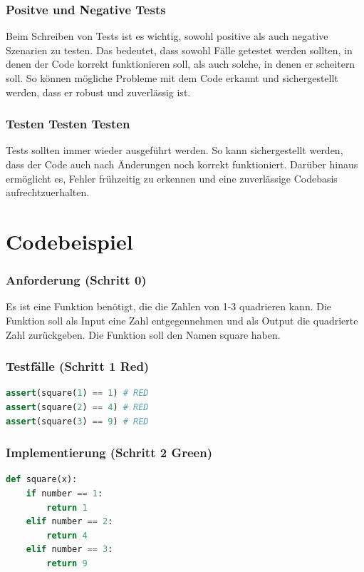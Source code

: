 \documentclass[a0,landscape]{a0poster}
\newcommand{\gqq}[1]{\glqq #1\grqq}
\begin{document}
\begin{multicols}{4}
\subsubsection*{Positve und Negative Tests}
Beim Schreiben von Tests ist es wichtig, sowohl positive als auch negative Szenarien zu testen. Das bedeutet, dass sowohl Fälle getestet werden sollten, in denen der Code korrekt funktionieren soll, als auch solche, in denen er scheitern soll. So können mögliche Probleme mit dem Code erkannt und sichergestellt werden, dass er robust und zuverlässig ist.

\subsubsection*{Testen Testen Testen}
Tests sollten immer wieder ausgeführt werden. So kann sichergestellt werden, dass der Code auch nach Änderungen noch korrekt funktioniert. Darüber hinaus ermöglicht es, Fehler frühzeitig zu erkennen und eine zuverlässige Codebasis aufrechtzuerhalten.

\section*{Codebeispiel}

\subsubsection*{Anforderung (Schritt 0)}
Es ist eine Funktion benötigt, die die Zahlen von 1-3 quadrieren kann.
Die Funktion soll als Input eine Zahl entgegennehmen und als Output die quadrierte Zahl zurückgeben.
Die Funktion soll den Namen \gqq{square} haben.

\subsubsection*{Testfälle (Schritt 1 \gqq{Red})}

\begin{lstlisting}[language=Python]
assert(square(1) == 1) # RED
assert(square(2) == 4) # RED
assert(square(3) == 9) # RED
\end{lstlisting}

\subsubsection*{Implementierung (Schritt 2 \gqq{Green})}
\begin{lstlisting}[language=Python]
def square(x):
    if number == 1:
        return 1
    elif number == 2:
        return 4
    elif number == 3:
        return 9


\end{lstlisting}
\end{multicols}
\end{document}
